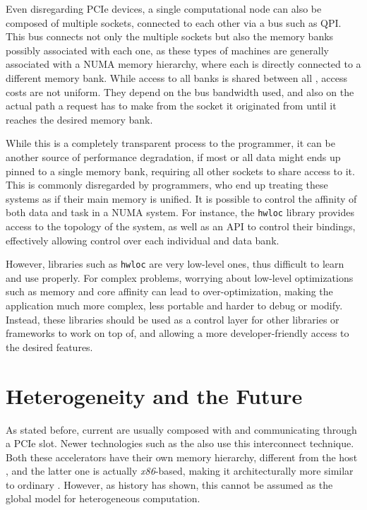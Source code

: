 \documentclass[main.tex]{subfiles}
\begin{document}
Even disregarding \acs{PCIe} devices, a single computational node can also be composed of multiple \cpu sockets, connected to each other via a bus such as \ac{QPI}. This bus connects not only the multiple sockets but also the memory banks possibly associated with each one, as these types of machines are generally associated with a \acs{NUMA} memory hierarchy, where each \cpu is directly connected to a different memory bank. While access to all banks is shared between all \cpus, access costs are not uniform. They depend on the bus bandwidth used, and also on the actual path a request has to make from the socket it originated from until it reaches the desired memory bank.

While this is a completely transparent process to the programmer, it can be another source of performance degradation, if most or all data might ends up pinned to a single memory bank, requiring all other sockets to share access to it. This is commonly disregarded by programmers, who end up treating these systems as if their main memory is unified. It is possible to control the affinity of both data and task in a \acs{NUMA} system. For instance, the \texttt{hwloc}\cite{broquedis2010hwloc} library provides access to the topology of the system, as well as an API to control their bindings, effectively allowing control over each individual \cpu and data bank.

However, libraries such as \texttt{hwloc} are very low-level ones, thus difficult to learn and use properly. For complex problems, worrying about low-level optimizations such as memory and core affinity can lead to over-optimization, making the application much more complex, less portable and harder to debug or modify.
Instead, these libraries should be used as a control layer for other libraries or frameworks to work on top of, and allowing a more developer-friendly access to the desired features.

\section{Heterogeneity and the Future}

As stated before, current \hetplats are usually composed with \cpus and \gpus communicating through a \acs{PCIe} slot. Newer technologies such as the \intel \mic also use this interconnect technique. Both these accelerators have their own memory hierarchy, different from the host \cpu, and the latter one is actually \textit{x86}-based, making it architecturally more similar to ordinary \cpus. However, as history has shown, this cannot be assumed as the global model for heterogeneous computation.
\end{document}
